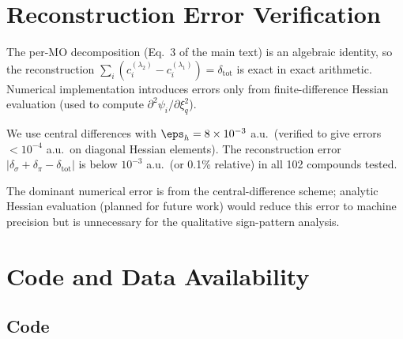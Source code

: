 \documentclass[11pt,a4paper]{article}
\begin{document}
\section{Reconstruction Error Verification}
\label{sec:recon}

The per-MO decomposition (Eq.~3 of the main text) is an algebraic
identity, so the reconstruction
$\sum_i (c_i^{(\lambda_2)} - c_i^{(\lambda_1)}) = \delta_{\text{tot}}$
is exact in exact arithmetic. Numerical implementation introduces
errors only from finite-difference Hessian evaluation
(used to compute $\partial^2 \psi_i/\partial \xi_q^2$).

We use central differences with $\eps_h = 8 \times 10^{-3}$ a.u.\
(verified to give errors $< 10^{-4}$ a.u.\ on diagonal Hessian
elements). The reconstruction error
$|\delta_\sigma + \delta_\pi - \delta_{\text{tot}}|$ is below
$10^{-3}$ a.u.\ (or 0.1\% relative) in all 102 compounds tested.

The dominant numerical error is from the central-difference scheme;
analytic Hessian evaluation (planned for future work) would reduce
this error to machine precision but is unnecessary for the qualitative
sign-pattern analysis.

\section{Code and Data Availability}
\label{sec:SI_code}

\subsection{Code}
\end{document}
